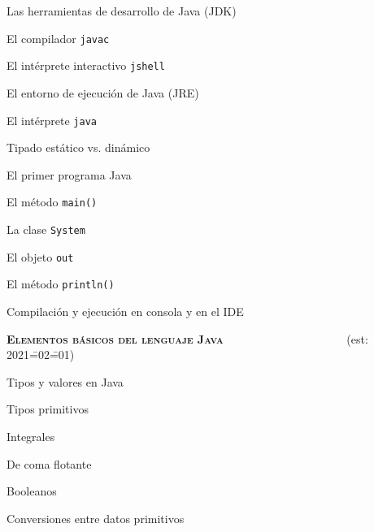 \begin{longenum}
\begin{longenum}
\begin{longenum}
            \item Las herramientas de desarrollo de Java (JDK)
            \begin{longenum}
                \item El compilador \texttt{javac}
                \item El intérprete interactivo \texttt{jshell}
            \end{longenum}
            \item El entorno de ejecución de Java (JRE)
            \begin{longenum}
                \item El intérprete \texttt{java}
            \end{longenum}
        \end{longenum}
        \item Tipado estático vs. dinámico
        \item El primer programa Java
        \begin{longenum}
            \item El método \texttt{main()}
            \item La clase \texttt{System}
            \item El objeto \texttt{out}
            \item El método \texttt{println()}
            \item Compilación y ejecución en consola y en el IDE
        \end{longenum}
    \end{longenum}
    \item \textbf{\textsc{Elementos básicos del lenguaje Java}} \ \ \ \ \ \ \ \ \ \ \ \ \ \ \ \ \ \ \ \ \ (est: 2021\==02\==01)
    \begin{longenum}
        \item Tipos y valores en Java
        \begin{longenum}
            \item Tipos  primitivos
            \begin{longenum}
                \item Integrales
                \item De coma flotante
                \item Booleanos
                \item Conversiones entre datos primitivos
                \begin{longenum}

\end{longenum}
\end{longenum}
\end{longenum}
\end{longenum}
\end{longenum}
